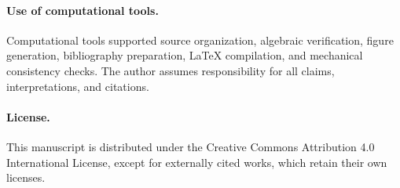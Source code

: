 \documentclass[11pt]{article}
\begin{document}
\paragraph{Use of computational tools.}
Computational tools supported source organization, algebraic verification, figure generation, bibliography preparation, LaTeX compilation, and mechanical consistency checks. The author assumes responsibility for all claims, interpretations, and citations.

\paragraph{License.}
This manuscript is distributed under the Creative Commons Attribution 4.0 International License, except for externally cited works, which retain their own licenses.



\end{document}
